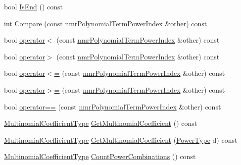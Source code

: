 \begin{DoxyCompactItemize}
\item 
bool \hyperlink{classnmr_polynomial_term_power_index_a4e645bdb125cd8bf1492147164f6df1e}{Is\-End} () const 
\item 
int \hyperlink{classnmr_polynomial_term_power_index_ab2d0e6ddf4ba6552fe41a7f6f36060cf}{Compare} (const \hyperlink{classnmr_polynomial_term_power_index}{nmr\-Polynomial\-Term\-Power\-Index} \&other) const 
\item 
bool \hyperlink{classnmr_polynomial_term_power_index_a86ec950f835100c801b962fab881bdbd}{operator$<$} (const \hyperlink{classnmr_polynomial_term_power_index}{nmr\-Polynomial\-Term\-Power\-Index} \&other) const 
\item 
bool \hyperlink{classnmr_polynomial_term_power_index_a8ddbd08d3ddbbb43c8d2b2560154d878}{operator$>$} (const \hyperlink{classnmr_polynomial_term_power_index}{nmr\-Polynomial\-Term\-Power\-Index} \&other) const 
\item 
bool \hyperlink{classnmr_polynomial_term_power_index_a0c0fc225dd6207be4425830de51ce3bb}{operator$<$=} (const \hyperlink{classnmr_polynomial_term_power_index}{nmr\-Polynomial\-Term\-Power\-Index} \&other) const 
\item 
bool \hyperlink{classnmr_polynomial_term_power_index_aea1064e73eda5c33686077ec34e174fb}{operator$>$=} (const \hyperlink{classnmr_polynomial_term_power_index}{nmr\-Polynomial\-Term\-Power\-Index} \&other) const 
\item 
bool \hyperlink{classnmr_polynomial_term_power_index_a5ec82dca98263dabd273d8b98d0f5920}{operator==} (const \hyperlink{classnmr_polynomial_term_power_index}{nmr\-Polynomial\-Term\-Power\-Index} \&other) const 
\item 
\hyperlink{classnmr_polynomial_term_power_index_a09f482da776cfb829e26ad1fb381ab94}{Multinomial\-Coefficient\-Type} \hyperlink{classnmr_polynomial_term_power_index_a7757268634207837173fee2e7c0bf8eb}{Get\-Multinomial\-Coefficient} () const 
\item 
\hyperlink{classnmr_polynomial_term_power_index_a09f482da776cfb829e26ad1fb381ab94}{Multinomial\-Coefficient\-Type} \hyperlink{classnmr_polynomial_term_power_index_a2f3e9788d333f91ae184a3d3018762af}{Get\-Multinomial\-Coefficient} (\hyperlink{classnmr_polynomial_term_power_index_a2eec01c3a2c3f56f47982ceffd8e36ed}{Power\-Type} d) const 
\item 
\hyperlink{classnmr_polynomial_term_power_index_a09f482da776cfb829e26ad1fb381ab94}{Multinomial\-Coefficient\-Type} \hyperlink{classnmr_polynomial_term_power_index_a23ab097c4291a51ac2ed67913ceb0e09}{Count\-Power\-Combinations} () const 

\end{DoxyCompactItemize}
